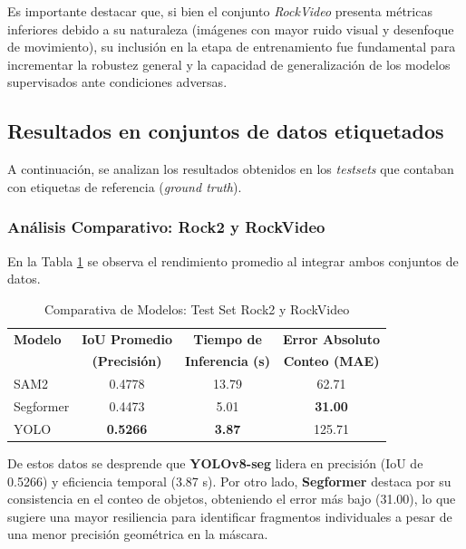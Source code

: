Es importante destacar que, si bien el conjunto \textit{RockVideo} presenta métricas inferiores debido a su naturaleza (imágenes con mayor ruido visual y desenfoque de movimiento), su inclusión en la etapa de entrenamiento fue fundamental para incrementar la robustez general y la capacidad de generalización de los modelos supervisados ante condiciones adversas.

\subsection{Resultados en conjuntos de datos etiquetados}

A continuación, se analizan los resultados obtenidos en los \textit{testsets} que contaban con etiquetas de referencia (\textit{ground truth}).

\subsubsection{Análisis Comparativo: Rock2 y RockVideo}

En la Tabla \ref{tab:comparativa-modelos} se observa el rendimiento promedio al integrar ambos conjuntos de datos. 

\begin{table}[ht]
	\centering
	\caption{Comparativa de Modelos: Test Set Rock2 y RockVideo}
	\label{tab:comparativa-modelos}
	\begin{tabular}{lccc}
		\toprule
		\textbf{Modelo} & \textbf{IoU Promedio} & \textbf{Tiempo de} & \textbf{Error Absoluto} \\
		& \textbf{(Precisión)} & \textbf{Inferencia (s)} & \textbf{Conteo (MAE)} \\
		\midrule
		SAM2      & 0.4778          & 13.79          & 62.71                    \\
		Segformer & 0.4473          & 5.01           & \textbf{31.00}           \\
		YOLO      & \textbf{0.5266} & \textbf{3.87}  & 125.71                   \\
		\bottomrule
	\end{tabular}
\end{table}

De estos datos se desprende que \textbf{YOLOv8-seg} lidera en precisión (IoU de 0.5266) y eficiencia temporal (3.87 s). Por otro lado, \textbf{Segformer} destaca por su consistencia en el conteo de objetos, obteniendo el error más bajo (31.00), lo que sugiere una mayor resiliencia para identificar fragmentos individuales a pesar de una menor precisión geométrica en la máscara.

